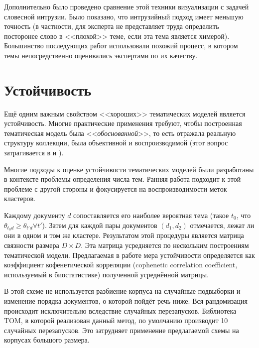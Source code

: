 Дополнительно было проведено сравнение этой техники визуализации с задачей словесной интрузии. Было показано, что интрузийный подход имеет меньшую точность (в частности, для эксперта не представляет труда определить посторонее слово в <<плохой>> теме, если эта тема является химерой). Большинство последующих работ использовали похожий процесс, в котором темы непосредственно оценивались экспертами по их качеству.


\section{Устойчивость}
Ещё одним важным свойством <<хороших>> тематических моделей является устойчивость. Многие практические применения требуют, чтобы построенная тематическая модель была <<\textit{обоснованной}>>, то есть отражала реальную структуру коллекции, была объективной и воспроизводимой (этот вопрос затрагивается в \cite{dh_sea} и \cite{agrawal2018wrong}).

Многие подходы к оценке устойчивости тематических моделей были разработаны в контексте проблемы определения числа тем. Ранняя работа \cite{Brunet4164} подходит к этой проблеме с другой стороны и фокусируется на воспроизводимости меток кластеров.

Каждому документу $d$ сопоставляется его наиболее вероятная тема (такое $t_0$, что $\theta_{t_0 d} \geq \theta_{t' d} \forall t'$). Затем для каждой пары документов $(d_1, d_2)$ отмечается, лежат ли они в одном и том же кластере. Результатом этой процедуры является матрица связности размера $D \times D$. Эта матрица усредняется по нескольким построениям тематической модели. Предлагаемая в работе мера устойчивости определяется как коэффициент кофенетической корреляции (cophenetic correlation coefficient, используемый в биостатистике) полученной усреднённой матрицы.

В этой схеме не используется разбиение корпуса на случайные подвыборки и изменение порядка документов, о которой пойдёт речь ниже. Вся рандомизация происходит исключительно вследствие случайных перезапусков. Библиотека TOM, в которой реализован данный метод, по умолчанию производит 10 случайных перезапусков. Это затрудняет применение предлагаемой схемы на корпусах большого размера.

